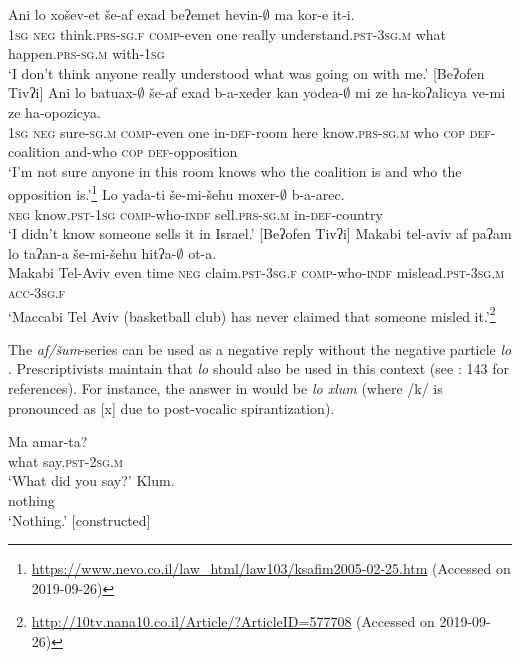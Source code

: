 \documentclass[output=paper,colorlinks,citecolor=brown]{langscibook}
\begin{document}
\ea\label{ex:heb:22}
    \ea\label{ex:heb:22a}
        \gll Ani lo xošev-et še-af exad beʔemet hevin-${\emptyset}$ ma kor-e it-i. \\
            \textsc{1sg} \textsc{neg} think.\textsc{prs-sg.f} \textsc{comp}{}-even one really understand.\textsc{pst-3sg.m} what happen.\textsc{prs-sg.m} with-1\textsc{sg}\\
        \glt ‘I don’t think anyone really understood what was going on with me.’ [Beʔofen Tivʔi]
    \ex\label{ex:heb:22b}
        \gll Ani lo batuax{}-${\emptyset}$ še-af exad b-a-xeder kan yodea-${\emptyset}$ mi ze ha-koʔalicya ve-mi ze ha-opozicya. \\
            \textsc{1sg} \textsc{neg} sure-\textsc{sg.m} \textsc{comp}{}-even one  in-\textsc{def}{}-room here know.\textsc{prs-sg.m} who  \textsc{cop} \textsc{def}{}-coalition and-who \textsc{cop} \textsc{def}{}-opposition\\
        \glt ‘I’m not sure anyone in this room knows who the coalition is and who the opposition is.’\footnote{\url{https://www.nevo.co.il/law_html/law103/ksafim2005-02-25.htm} (Accessed on 2019-09-26)}
    \ex\label{ex:heb:22c}
        \gll Lo yada-ti še-mi-šehu moxer-${\emptyset}$ b-a-arec.\\
            \textsc{neg} know.\textsc{pst-1sg} \textsc{comp}{}-who-\textsc{indf} sell.\textsc{prs-sg.m} in-\textsc{def}{}-country \\
        \glt ‘I didn’t know someone sells it in Israel.’ [Beʔofen Tivʔi]
    \ex\label{ex:heb:22d}
        \gll Makabi tel{}-aviv af paʔam lo taʔan-a še-mi-šehu hitʔa-${\emptyset}$ ot-a. \\
            Makabi Tel-Aviv even time \textsc{neg} claim.\textsc{pst-3sg.f} \textsc{comp}{}-who-\textsc{indf} mislead.\textsc{pst{}-3sg.m} \textsc{acc-3sg.f}\\
        \glt ‘Maccabi Tel Aviv (basketball club) has never claimed that someone misled it.’\footnote{\url{http://10tv.nana10.co.il/Article/?ArticleID=577708} (Accessed on 2019-09-26)} 
    \z 
\z 

The \textit{af/šum}{}-series can be used as a negative reply without the negative particle \textit{lo} . Prescriptivists maintain that \textit{lo} should also be used in this context (see \citealt{Tzivoni1993}: 143 for references). For instance, the answer in  would be \textit{lo xlum} (where /k/ is pronounced as [x] due to post-vocalic spirantization).

\ea\label{ex:heb:23}
    \begin{xlist}[A: ]
    \label{ex:heb:23A}
        \gll  Ma amar-ta?\\ 
               what say.\textsc{pst-2sg.m}\\ 
        \glt ‘What did you say?'
    \label{ex:heb:23B}
        \gll  Klum.\\ 
                nothing\\
        \glt ‘Nothing.’ [constructed]
    \end{xlist}
\z 
\end{document}
